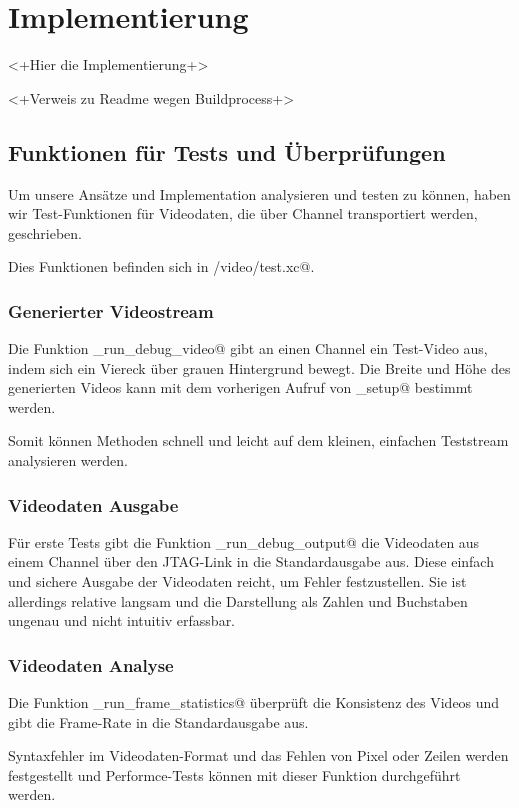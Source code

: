 
\chapter{Implementierung}
<+Hier die Implementierung+>

<+Verweis zu Readme wegen Buildprocess+>

\section{Funktionen für Tests und Überprüfungen}
Um unsere Ansätze und Implementation analysieren und testen zu können,
haben wir Test-Funktionen für Videodaten, die über Channel transportiert
werden, geschrieben.

Dies Funktionen befinden sich in \verb@board/video/test.xc@.

\subsection{Generierter Videostream}
Die Funktion \lstinline@tst_run_debug_video@ gibt an einen Channel ein Test-Video aus,
indem sich ein Viereck über grauen Hintergrund bewegt.
Die Breite und Höhe des generierten Videos kann mit dem vorherigen Aufruf von
\lstinline@tst_setup@ bestimmt werden. 

Somit können Methoden schnell und leicht auf dem kleinen, einfachen
Teststream analysieren werden.

\subsection{Videodaten Ausgabe}
Für erste Tests gibt die Funktion \lstinline@tst_run_debug_output@ die
Videodaten aus einem Channel über den JTAG-Link in die Standardausgabe aus.
Diese einfach und sichere Ausgabe der Videodaten reicht, um Fehler
festzustellen. 
Sie ist allerdings relative langsam und die Darstellung als Zahlen und Buchstaben
ungenau und nicht intuitiv erfassbar.

\subsection{Videodaten Analyse}
Die Funktion \lstinline@tst_run_frame_statistics@ überprüft die Konsistenz des
Videos und gibt die Frame-Rate in die Standardausgabe aus.

Syntaxfehler im Videodaten-Format und das Fehlen von Pixel oder Zeilen 
werden festgestellt und Performce-Tests können mit dieser Funktion durchgeführt
werden.

